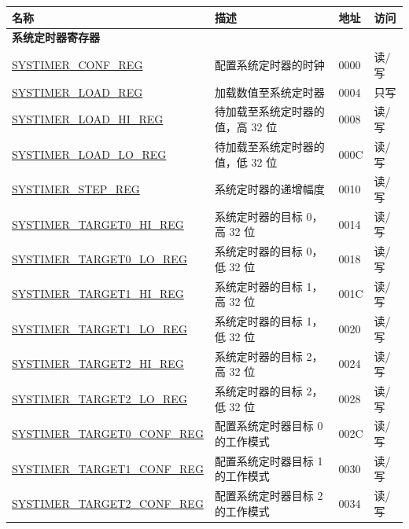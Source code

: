 \begin{longtable}{ | p{6cm} | p{7.2cm} | p{1.3cm} | p{1cm} | }
\hline\rowcolor{lightgray}
名称 & 描述 &  地址 & 访问 \\ \hline
\endhead
\multicolumn{4}{|l|}{\textbf{系统定时器寄存器}} \\ \hline
\hyperref[regdesc:SYSTIMERCONFREG]{SYSTIMER\_CONF\_REG} & 配置系统定时器的时钟 & \hexprefix{}0000 & 读/写 \\ \hline
\hyperref[regdesc:SYSTIMERLOADREG]{SYSTIMER\_LOAD\_REG} & 加载数值至系统定时器 & \hexprefix{}0004 & 只写 \\ \hline
\hyperref[regdesc:SYSTIMERLOADHIREG]{SYSTIMER\_LOAD\_HI\_REG} & 待加载至系统定时器的值，高 32 位 & \hexprefix{}0008 & 读/写 \\ \hline
\hyperref[regdesc:SYSTIMERLOADLOREG]{SYSTIMER\_LOAD\_LO\_REG} & 待加载至系统定时器的值，低 32 位 & \hexprefix{}000C & 读/写 \\ \hline
\hyperref[regdesc:SYSTIMERSTEPREG]{SYSTIMER\_STEP\_REG} & 系统定时器的递增幅度 & \hexprefix{}0010 & 读/写 \\ \hline
\hyperref[regdesc:SYSTIMERTARGET0HIREG]{SYSTIMER\_TARGET0\_HI\_REG} & 系统定时器的目标 0，高 32 位 & \hexprefix{}0014 & 读/写 \\ \hline
\hyperref[regdesc:SYSTIMERTARGET0LOREG]{SYSTIMER\_TARGET0\_LO\_REG} & 系统定时器的目标 0，低 32 位 & \hexprefix{}0018 & 读/写 \\ \hline
\hyperref[regdesc:SYSTIMERTARGET1HIREG]{SYSTIMER\_TARGET1\_HI\_REG} & 系统定时器的目标 1，高 32 位 & \hexprefix{}001C & 读/写 \\ \hline
\hyperref[regdesc:SYSTIMERTARGET1LOREG]{SYSTIMER\_TARGET1\_LO\_REG} & 系统定时器的目标 1，低 32 位 & \hexprefix{}0020 & 读/写 \\ \hline
\hyperref[regdesc:SYSTIMERTARGET2HIREG]{SYSTIMER\_TARGET2\_HI\_REG} & 系统定时器的目标 2，高 32 位 & \hexprefix{}0024 & 读/写 \\ \hline
\hyperref[regdesc:SYSTIMERTARGET2LOREG]{SYSTIMER\_TARGET2\_LO\_REG} & 系统定时器的目标 2，低 32 位 & \hexprefix{}0028 & 读/写 \\ \hline
\hyperref[regdesc:SYSTIMERTARGET0CONFREG]{SYSTIMER\_TARGET0\_CONF\_REG} & 配置系统定时器目标 0 的工作模式 & \hexprefix{}002C & 读/写 \\ \hline
\hyperref[regdesc:SYSTIMERTARGET1CONFREG]{SYSTIMER\_TARGET1\_CONF\_REG} & 配置系统定时器目标 1 的工作模式 & \hexprefix{}0030 & 读/写 \\ \hline
\hyperref[regdesc:SYSTIMERTARGET2CONFREG]{SYSTIMER\_TARGET2\_CONF\_REG} & 配置系统定时器目标 2 的工作模式 & \hexprefix{}0034 & 读/写 \\ \hline

\end{longtable}
